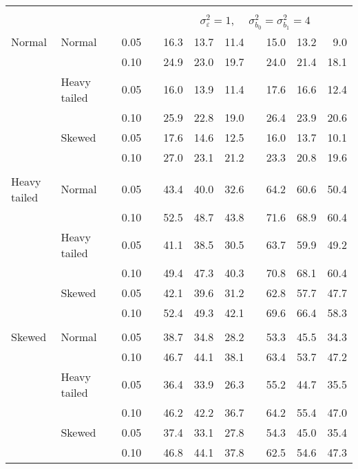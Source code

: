 \begin{table}[ht]
\begin{scriptsize}
\begin{tabular}{ll p{.1cm} c p{.1cm} rrr p{.1cm} rrr}
&&&&&&&&&&&\\
& && && \multicolumn{7}{c}{$\sigma_{\varepsilon}^2 = 1$, \ \ $\sigma_{b_0}^2 = \sigma_{b_1}^2 = 4$} \\ \cline{6-12}
\rowcolor{gray!20} Normal & Normal &  & 0.05 &  & 16.3 & 13.7 & 11.4 &  & 15.0 & 13.2 & 9.0 \\ 
\rowcolor{gray!20}    &  &  & 0.10 &  & 24.9 & 23.0 & 19.7 &  & 24.0 & 21.4 & 18.1 \\ 
\rowcolor{gray!20}    & Heavy tailed &  & 0.05 &  & 16.0 & 13.9 & 11.4 &  & 17.6 & 16.6 & 12.4 \\ 
\rowcolor{gray!20}    &  &  & 0.10 &  & 25.9 & 22.8 & 19.0 &  & 26.4 & 23.9 & 20.6 \\ 
\rowcolor{gray!20}    & Skewed &  & 0.05 &  & 17.6 & 14.6 & 12.5 &  & 16.0 & 13.7 & 10.1 \\ 
\rowcolor{gray!20}    &  &  & 0.10 &  & 27.0 & 23.1 & 21.2 &  & 23.3 & 20.8 & 19.6 \\ 
             &&&&&&&&&&&\\
  Heavy tailed & Normal &  & 0.05 &  & 43.4 & 40.0 & 32.6 &  & 64.2 & 60.6 & 50.4 \\ 
   &  &  & 0.10 &  & 52.5 & 48.7 & 43.8 &  & 71.6 & 68.9 & 60.4 \\ 
   & Heavy tailed &  & 0.05 &  & 41.1 & 38.5 & 30.5 &  & 63.7 & 59.9 & 49.2 \\ 
   & &  & 0.10 &  & 49.4 & 47.3 & 40.3 &  & 70.8 & 68.1 & 60.4 \\ 
   & Skewed &  & 0.05 &  & 42.1 & 39.6 & 31.2 &  & 62.8 & 57.7 & 47.7 \\ 
   &  &  & 0.10 &  & 52.4 & 49.3 & 42.1 &  & 69.6 & 66.4 & 58.3 \\ 
             &&&&&&&&&&&\\
  Skewed & Normal &  & 0.05 &  & 38.7 & 34.8 & 28.2 &  & 53.3 & 45.5 & 34.3 \\ 
   &  &  & 0.10 &  & 46.7 & 44.1 & 38.1 &  & 63.4 & 53.7 & 47.2 \\ 
   & Heavy tailed &  & 0.05 &  & 36.4 & 33.9 & 26.3 &  & 55.2 & 44.7 & 35.5 \\ 
   &  &  & 0.10 &  & 46.2 & 42.2 & 36.7 &  & 64.2 & 55.4 & 47.0 \\ 
   & Skewed &  & 0.05 &  & 37.4 & 33.1 & 27.8 &  & 54.3 & 45.0 & 35.4 \\ 
   &  &  & 0.10 &  & 46.8 & 44.1 & 37.8 &  & 62.5 & 54.6 & 47.3 \\ 

\hline
\end{tabular}
\end{scriptsize}
\end{table}




